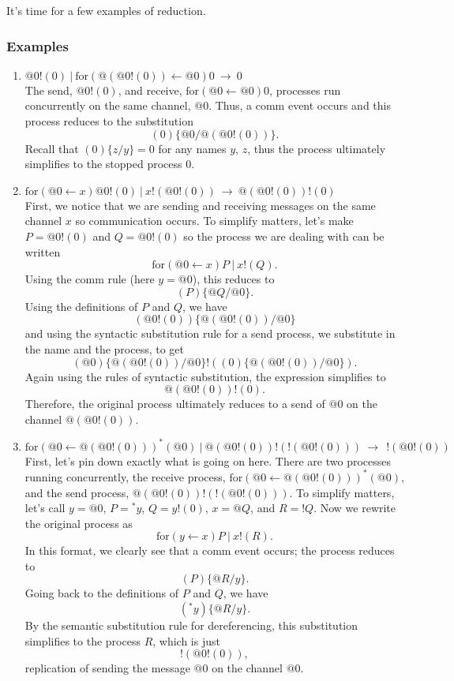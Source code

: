 \documentclass[12pt]{article}
\numberwithin{equation}{section}
\begin{document}
It's time for a few examples of reduction.

\subsubsection{Examples}
\begin{enumerate}
\item $@0!(0) \ | \ \text{for}( @(@0!(0)) \leftarrow @0)0 \ \rightarrow \ 0$ \\
The send, $@0!(0)$, and receive, $\text{for}( @0 \leftarrow @0)0$, processes run concurrently on the same channel, $@0$. Thus, a comm event occurs and this process reduces to the substitution
\[ (0)\{ @0 / @(@0!(0)) \}. \]
Recall that $(0)\{ z / y \}=0$ for any names $y$, $z$, thus the process ultimately simplifies to the stopped process $0$.

\item $\text{for}( @0 \leftarrow x)@0!(0) \ | \ x!(@0!(0)) \ \rightarrow \ @(@0!(0))!(0)$ \\
First, we notice that we are sending and receiving messages on the same channel $x$ so communication occurs. To simplify matters, let's make $P=@0!(0)$ and $Q=@0!(0)$ so the process we are dealing with can be written
\[ \text{for}( @0 \leftarrow x)P \ | \ x!(Q). \]
Using the comm rule (here $y=@0$), this reduces to
\[ (P)\{ @Q / @0 \}. \]
Using the definitions of $P$ and $Q$, we have
\[  (@0!(0))\{ @(@0!(0)) / @0 \} \]
and using the syntactic substitution rule for a send process, we substitute in the name and the process, to get
\[ (@0)\{ @(@0!(0)) / @0 \}!((0)\{ @(@0!(0)) / @0 \}). \]
Again using the rules of syntactic substitution, the expression simplifies to
\[ @(@0!(0))!(0). \]
Therefore, the original process ultimately reduces to a send of $@0$ on the channel $@(@0!(0))$.

\item $\displaystyle \text{for}(@0 \leftarrow @(@0!(0)))^*(@0) \ | \ @(@0!(0))!(!(@0!(0))) \ \rightarrow \ \ !(@0!(0))$ \\
First, let's pin down exactly what is going on here. There are two processes running concurrently, the receive process, $\text{for}(@0 \leftarrow @(@0!(0)))^*(@0)$, and the send process, $@(@0!(0))!(!(@0!(0)))$. To simplify matters, let's call $y=@0$, $P={}^*y$, $Q=y!(0)$, $x=@Q$, and $R=!Q$. Now we rewrite the original process as
\[ \text{for}( y \leftarrow x)P \ | \ x!(R). \]
In this format, we clearly see that a comm event occurs; the process reduces to
\[ (P)\{ @R / y \}. \]
Going back to the definitions of $P$ and $Q$, we have
\[ ({}^*y)\{ @R / y \}. \]
By the semantic substitution rule for dereferencing, this substitution simplifies to the process $R$, which is just
\[ !(@0!(0)), \]
replication of sending the message $@0$ on the channel $@0$.
\end{enumerate}
\end{document}
